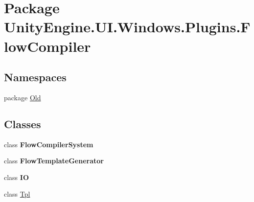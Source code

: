 \hypertarget{namespace_unity_engine_1_1_u_i_1_1_windows_1_1_plugins_1_1_flow_compiler}{}\section{Package Unity\+Engine.\+U\+I.\+Windows.\+Plugins.\+Flow\+Compiler}
\label{namespace_unity_engine_1_1_u_i_1_1_windows_1_1_plugins_1_1_flow_compiler}
\subsection*{Namespaces}
\begin{DoxyCompactItemize}
\item 
package \hyperlink{namespace_unity_engine_1_1_u_i_1_1_windows_1_1_plugins_1_1_flow_compiler_1_1_old}{Old}
\end{DoxyCompactItemize}
\subsection*{Classes}
\begin{DoxyCompactItemize}
\item 
class {\bfseries Flow\+Compiler\+System}
\item 
class {\bfseries Flow\+Template\+Generator}
\item 
class {\bfseries I\+O}
\item 
class \hyperlink{class_unity_engine_1_1_u_i_1_1_windows_1_1_plugins_1_1_flow_compiler_1_1_tpl}{Tpl}
\end{DoxyCompactItemize}
